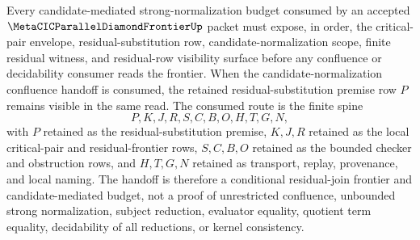 \begin{theorem}
\label{thm:metacic-parallel-diamond-frontier-candidate-sn-handoff}
Every candidate-mediated strong-normalization budget consumed by an accepted $\MetaCICParallelDiamondFrontierUp$ packet must expose, in order, the critical-pair envelope, residual-substitution row, candidate-normalization scope, finite residual witness, and residual-row visibility surface before any confluence or decidability consumer reads the frontier. When the candidate-normalization confluence handoff is consumed, the retained residual-substitution premise row $P$ remains visible in the same read. The consumed route is the finite spine
$$
P,K,J,R,S,C,B,O,H,T,G,N ,
$$
with $P$ retained as the residual-substitution premise, $K,J,R$ retained as the local critical-pair and residual-frontier rows, $S,C,B,O$ retained as the bounded checker and obstruction rows, and $H,T,G,N$ retained as transport, replay, provenance, and local naming. The handoff is therefore a conditional residual-join frontier and candidate-mediated budget, not a proof of unrestricted confluence, unbounded strong normalization, subject reduction, evaluator equality, quotient term equality, decidability of all reductions, or kernel consistency.
\end{theorem}
